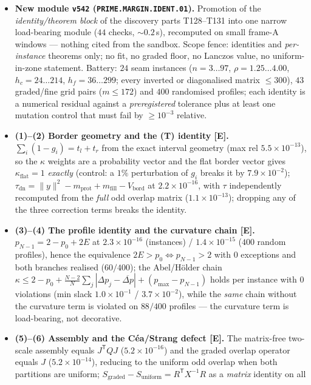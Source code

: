 \documentclass[11pt]{article}
\providecommand{\mE}{\textbf{[E]}}\providecommand{\mC}{\textbf{[C]}}
\begin{document}
\begin{itemize}[leftmargin=1.5em]
\item \textbf{New module \texttt{v542} (\texttt{PRIME.MARGIN.IDENT.01}).} Promotion of the
\emph{identity/theorem block} of the discovery parts T128--T131 into one narrow load-bearing module
($44$ checks, ${\sim}0.2$\,s), recomputed on small frame-A windows --- nothing cited from the
sandbox. Scope fence: identities and \emph{per-instance} theorems only; no fit, no graded floor, no
Lanczos value, no uniform-in-zone statement. Battery: $24$ seam instances ($n=3\ldots97$,
$\rho=1.25\ldots4.00$, $h_c=24\ldots214$, $h_f=36\ldots299$; every inverted or diagonalised matrix
$\le300$), $43$ graded/fine grid pairs ($m\le172$) and $400$ randomised profiles; each identity is a
numerical residual against a \emph{preregistered} tolerance plus at least one mutation control that
must fail by $\ge10^{-3}$ relative.
\item \textbf{(1)--(2) Border geometry and the (T) identity \mE.} $\sum_i(1-g_i)=t_l+t_r$ from the
exact interval geometry (max rel $5.5\times10^{-13}$), so the $\kappa$ weights are a probability
vector and the flat border vector gives $\kappa_{\mathrm{flat}}=1$ \emph{exactly} (control: a $1\%$
perturbation of $g_i$ breaks it by $7.9\times10^{-2}$);
$\tau_{\mathrm{dn}}=\|y\|^2-m_{\mathrm{prot}}+m_{\mathrm{fill}}-V_{\mathrm{bord}}$ at
$2.2\times10^{-16}$, with $\tau$ independently recomputed from the \emph{full} odd overlap matrix
($1.1\times10^{-13}$); dropping any of the three correction terms breaks the identity.
\item \textbf{(3)--(4) The profile identity and the curvature chain \mE.}
$p_{N-1}=2-p_0+2E$ at $2.3\times10^{-16}$ (instances) / $1.4\times10^{-15}$ ($400$ random
profiles), hence the equivalence $2E>p_0\iff p_{N-1}>2$ with $0$ exceptions and both branches
realised ($60/400$); the Abel/H\"older chain
$\kappa\le2-p_0+\frac{N-2}{N}\sum_j|\Delta p_j-\overline{\Delta p}|+(p_{\max}-p_{N-1})$ holds per
instance with $0$ violations (min slack $1.0\times10^{-1}$ / $3.7\times10^{-2}$), while the
\emph{same} chain without the curvature term is violated on $88/400$ profiles --- the curvature term
is load-bearing, not decorative.
\item \textbf{(5)--(6) Assembly and the C\'ea/Strang defect \mE.} The matrix-free two-scale assembly
equals $J^{\mathsf T}QJ$ ($5.2\times10^{-16}$) and the graded overlap operator equals $J$
($5.2\times10^{-14}$), reducing to the uniform odd overlap when both partitions are uniform;
$S_{\mathrm{graded}}-S_{\mathrm{uniform}}=R^{\mathsf T}X^{-1}R$ as a \emph{matrix} identity on all

\end{itemize}
\end{document}
